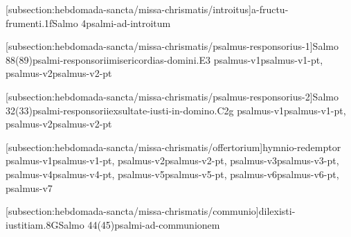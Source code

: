 \def\Prefix{subsection:hebdomada-sancta/missa-chrismatis}

[\Prefix/introitus]{a-fructu-frumenti.1f}{Salmo 4}{psalmi-ad-introitum}

[\Prefix/psalmus-responsorius-1]{Salmo 88(89)}{psalmi-responsorii}{misericordias-domini.E3}{
  {psalmus-v1}{psalmus-v1-pt},
  {psalmus-v2}{psalmus-v2-pt}
}

\AllowPageFlush

[\Prefix/psalmus-responsorius-2]{Salmo 32(33)}{psalmi-responsorii}{exsultate-iusti-in-domino.C2g}{
  {psalmus-v1}{psalmus-v1-pt},
  {psalmus-v2}{psalmus-v2-pt}
}

\AllowPageBreak

[\Prefix/offertorium]{hymni}{o-redemptor}{
  {psalmus-v1}{psalmus-v1-pt},
  {psalmus-v2}{psalmus-v2-pt},
  {psalmus-v3}{psalmus-v3-pt},
  {psalmus-v4}{psalmus-v4-pt},
  {psalmus-v5}{psalmus-v5-pt},
  {psalmus-v6}{psalmus-v6-pt},
  {psalmus-v7}{}
}

\AllowPageFlush

[\Prefix/communio]{dilexisti-iustitiam.8G}{Salmo 44(45)}{psalmi-ad-communionem}